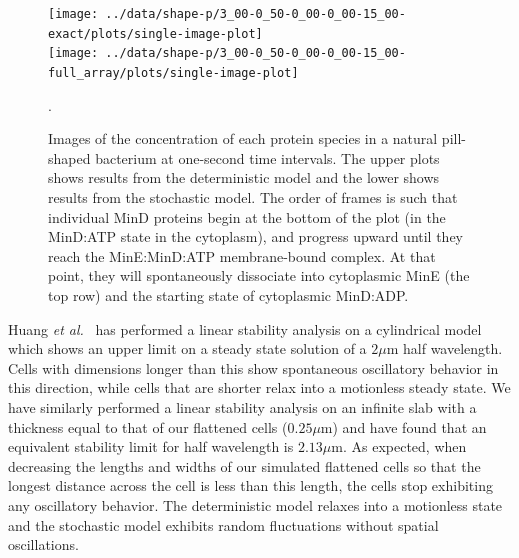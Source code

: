 \documentclass[letterpaper,twocolumn,amsmath,amssymb,pre]{revtex4-1}
\newcommand\micron{\ensuremath{\mu\text{m}}}
\begin{document}
\begin{figure}
  \begin{center}
    \texttt{[image: ../data/shape-p/3\_00-0\_50-0\_00-0\_00-15\_00-exact/plots/single-image-plot]}\\
    \vspace{-1.5em}
    \texttt{[image: ../data/shape-p/3\_00-0\_50-0\_00-0\_00-15\_00-full\_array/plots/single-image-plot]}
    \vspace{-1.5em}
  \end{center}
  \caption{Images of the concentration of each protein species in a
    natural pill-shaped bacterium at one-second time intervals. The
    upper plots shows results from the deterministic model and the
    lower shows results from the stochastic model.  The order of
    frames is such that individual MinD proteins begin at the bottom
    of the plot (in the MinD:ATP state in the cytoplasm), and progress
    upward until they reach the MinE:MinD:ATP membrane-bound complex.
    At that point, they will spontaneously dissociate into cytoplasmic
    MinE (the top row) and the starting state of cytoplasmic
    MinD:ADP.}.
  \label{image-p}
\end{figure}

Huang \emph{et al.}~\cite{huang2003dynamic} has performed a linear
stability analysis on a cylindrical model which shows an upper limit
on a steady state solution of a $2\micron$ half wavelength.  Cells
with dimensions longer than this show spontaneous oscillatory behavior
in this direction, while cells that are shorter relax into a
motionless steady state.  We have similarly performed a linear
stability analysis on an infinite slab with a thickness equal to that
of our flattened cells ($0.25\micron$) and have found that an
equivalent stability limit for half wavelength is $2.13\micron$. As
expected, when decreasing the lengths and widths of our simulated
flattened cells so that the longest distance across the cell is less
than this length, the cells stop exhibiting any oscillatory behavior.
The deterministic model relaxes into a motionless state and the
stochastic model exhibits random fluctuations without spatial
oscillations.



\end{document}
